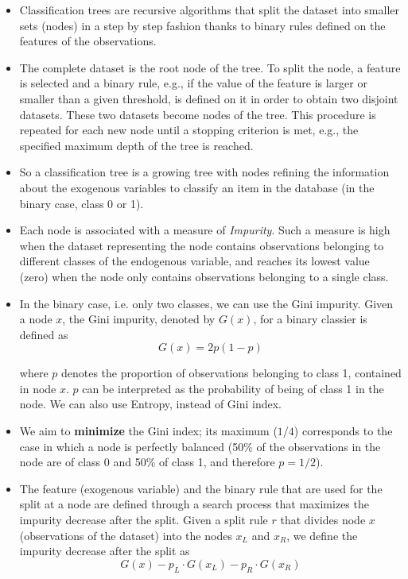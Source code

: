 \begin{itemize}
    \item Classification trees are recursive algorithms that split the dataset into smaller sets (nodes) in a step by step fashion thanks to binary rules defined on the features of the observations. 
    \item The complete dataset is the root node of the tree. To split the node, a feature is selected and a binary rule, e.g., if the value of the feature is larger or smaller than a given threshold, is defined on it in order to obtain two disjoint datasets. These two datasets become nodes of the tree. This procedure is repeated for each new node until a stopping criterion is met, e.g., the specified maximum depth of the tree is reached. 
    \item So a classification tree is a growing tree with nodes refining the information about the exogenous variables to classify an item in the database (in the binary case, class 0 or 1). 
    \item Each node is associated with a measure of \textit{Impurity}. Such a measure is high when the dataset representing the node contains observations belonging to different classes of the endogenous variable, and reaches its lowest value (zero) when the node only contains observations belonging to a single class.
    \item In the binary case, i.e. only two classes, we can use the Gini impurity. Given a node $x$, the Gini impurity, denoted by $G(x)$, for a binary classier is defined as
          \begin{equation*}
              G(x) = 2p(1-p)
          \end{equation*}
          
          where $p$ denotes the proportion of observations belonging to class 1, contained in node $x$. $p$ can be interpreted as the probability of being of class 1 in the node. We can also use Entropy, instead of Gini index.
    \item We aim to \textbf{minimize} the Gini index; its maximum ($1/4$) corresponds to the case in which a node is perfectly balanced (50\% of the observations in the node are of class 0 and 50\% of class 1, and therefore $p=1/2$).
    \item The feature (exogenous variable) and the binary rule that are used for the split at a node are defined through a search process that maximizes the impurity decrease after the split. Given a split rule $r$ that divides node $x$ (observations of the dataset) into the nodes $x_{L}$ and $x_{R}$, we define the impurity decrease after the split as
          \begin{equation*}
              G\left(x\right) -p_{L} \cdot G\left(x_{L}\right) -p_{R} \cdot G\left(x_{R}\right)
          \end{equation*}
          

\end{itemize}
